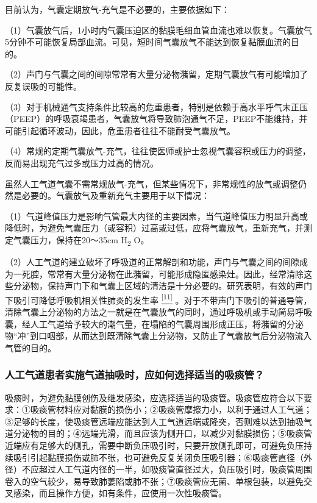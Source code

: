 目前认为，气囊定期放气-充气是不必要的，主要依据如下：

（1）气囊放气后，1小时内气囊压迫区的黏膜毛细血管血流也难以恢复。气囊放气5分钟不可能恢复局部血流。可见，短时间气囊放气不能达到恢复黏膜血流的目的。

（2）声门与气囊之间的间隙常常有大量分泌物潴留，定期气囊放气有可能增加了反复误吸的可能性。

（3）对于机械通气支持条件比较高的危重患者，特别是依赖于高水平呼气末正压（PEEP）的呼吸衰竭患者，气囊放气将导致肺泡通气不足，PEEP不能维持，并可能引起循环波动，因此，危重患者往往不能耐受气囊放气。

（4）常规的定期气囊放气-充气，往往使医师或护士忽视气囊容积或压力的调整，反而易出现充气过多或压力过高的情况。

虽然人工气道气囊不需常规放气-充气，但某些情况下，非常规性的放气或调整仍然是必要的。气囊放气及重新充气主要用于以下情况：

（1）气道峰值压力是影响气管最大内径的主要因素，当气道峰值压力明显升高或降低时，为避免气囊压力（或容积）过高或过低，应将气囊放气，重新充气，并测定气囊压力，保持在20～35cm
H\textsubscript{2} O。

（2）人工气道的建立破坏了呼吸道的正常解剖和功能，声门与气囊之间的间隙成为一死腔，常常有大量分泌物在此潴留，可能形成隐匿感染灶。因此，经常清除这些分泌物，保持声门下和气囊上区域的清洁是十分必要的。研究表明，有效的声门下吸引可降低呼吸机相关性肺炎的发生率
\protect\hyperlink{text00015.htmlux5cux23ch11-14}{\textsuperscript{{[}11{]}}}
。对于不带声门下吸引的普通导管，清除气囊上分泌物的方法之一就是在气囊放气的同时，通过呼吸机或手动简易呼吸囊，经人工气道给予较大的潮气量，在塌陷的气囊周围形成正压，将潴留的分泌物“冲”到口咽部，从而达到既清除气囊上分泌物，又防止了气囊放气后分泌物流入气管的目的。

\subsubsection{人工气道患者实施气道抽吸时，应如何选择适当的吸痰管？}

吸痰时，为避免黏膜创伤及继发感染，应选择适当的吸痰管。吸痰管应符合以下要求：①吸痰管材料应对黏膜的损伤小；②吸痰管摩擦力小，以利于通过人工气道；③足够的长度，使吸痰管远端应能达到人工气道远端或隆突，否则难以达到抽吸气道分泌物的目的；④远端光滑，而且应该为侧开口，以减少对黏膜损伤；⑤吸痰管近端应有足够大的侧孔，需要中断负压吸引时，只要开放侧孔即可，可避免负压持续吸引引起黏膜损伤或肺不张，也可避免反复关闭负压吸引器；⑥吸痰管直径（外径）不应超过人工气道内径的一半，如吸痰管直径过大，负压吸引时，吸痰管周围卷入的空气较少，易导致肺萎陷或肺不张；⑦吸痰管应无菌、单根包装，以避免交叉感染，而且操作方便，如有条件，应使用一次性吸痰管。

